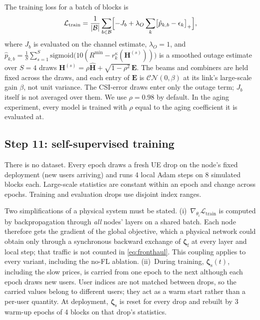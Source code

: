 \documentclass[conference]{IEEEtran}
\newcommand{\zs}{\boldsymbol{\zeta}_{\mathrm{s}}}
\newcommand{\zf}{\boldsymbol{\zeta}_{\mathrm{f}}}
\newcommand{\Loss}{\mathcal{L}}
\begin{document}
The training loss for a batch of blocks is
\begin{equation}
\Loss_{\mathrm{train}} = \frac{1}{|\mathcal{B}|}\sum_{b\in\mathcal{B}}
\Bigl[-J_b + \lambda_O\sum_k\bigl[\hat p_{k,b} - \epsilon_k\bigr]_+\Bigr],
\label{eq:loss}
\end{equation}
where $J_b$ is evaluated on the channel estimate, $\lambda_O=1$, and
$\hat p_{k,b} = \frac1S\sum_{s=1}^S\mathrm{sigmoid}\bigl(10(R^{\min}-
r^\kappa_k(\mathbf{H}^{(s)}))\bigr)$ is a smoothed outage estimate over $S=4$
draws $\mathbf{H}^{(s)} = \rho\hat{\mathbf{H}} + \sqrt{1-\rho^2}\,\mathbf{E}$.
The beams and combiners are held fixed across the draws, and each entry of
$\mathbf{E}$ is $\mathcal{CN}(0,\beta)$ at its link's large-scale gain
$\beta$, not unit variance. The CSI-error draws enter only the outage term;
$J_b$ itself is not averaged over them. We use $\rho=0.98$ by default. In the
aging experiment, every model is trained with $\rho$ equal to the aging
coefficient it is evaluated at.

\subsection{Step 11: self-supervised training}\label{sec:train}
There is no dataset. Every epoch draws a fresh UE drop on the node's fixed
deployment (new users arriving) and runs 4 local Adam steps on 8 simulated
blocks each. Large-scale statistics are constant within an epoch and change
across epochs. Training and evaluation drops use disjoint index ranges.

Two simplifications of a physical system must be stated.
(i)~$\nabla_{\theta_i}\Loss_{\mathrm{train}}$ is computed by backpropagation
through \emph{all} nodes' layers on a shared batch. Each node therefore gets
the gradient of the global objective, which a physical network could obtain
only through a synchronous backward exchange of $\zf$ at every layer and
local step; that traffic is not counted in \eqref{eq:fronthaul}. This
coupling applies to every variant, including the no-FL ablation.
(ii)~During training, $\zs(t)$, including the slow prices, is carried from
one epoch to the next although each epoch draws new users. User indices are
not matched between drops, so the carried values belong to different users;
they act as a warm start rather than a per-user quantity. At deployment,
$\zs$ is reset for
every drop and rebuilt by 3 warm-up epochs of 4 blocks on that drop's
statistics.
\end{document}
